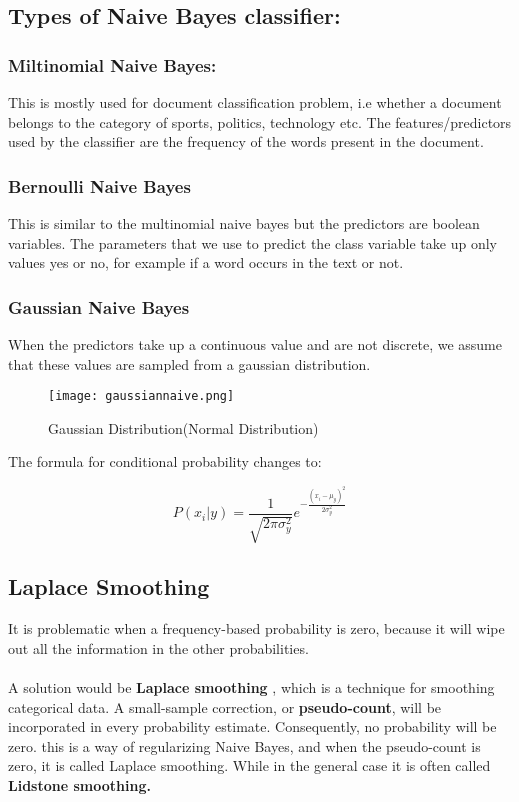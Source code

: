 \documentclass[12pt, A4]{report}
\begin{document}
\subsection*{Types of Naive Bayes classifier:}
	\subsubsection*{Miltinomial Naive Bayes:}
		This is mostly used for document classification problem, i.e whether a document belongs to the category of sports, politics, technology etc. The features/predictors used by the classifier are the frequency of the words present in the document.

	\subsubsection*{Bernoulli Naive Bayes}
		This is similar to the multinomial naive bayes but the predictors are boolean variables. The parameters that we use to predict the class variable take up only values yes or no, for example if a word occurs in the text or not.

	\subsubsection*{Gaussian Naive Bayes}
		When the predictors take up a continuous value and are not discrete, we assume that these values are sampled from a gaussian distribution.

		\begin{figure}[h]
			\centering
			\texttt{[image: gaussiannaive.png]}
			\caption{Gaussian Distribution(Normal Distribution)}
		\end{figure}

		The formula for conditional probability changes to:

		\begin{equation}
			P(x_i|y) = \frac{1}{\sqrt{2\pi\sigma_y^2}}e^{-\frac{(x_i-\mu_y)^2}{2\sigma_y^2}}
		\end{equation}

\subsection*{Laplace Smoothing}
	It is problematic when a frequency-based probability is zero, because it will wipe out all the information in the other probabilities.\\ \\
	A solution would be \textbf{Laplace smoothing} , which is a technique for smoothing categorical data. A small-sample correction, or \textbf{pseudo-count}, will be incorporated in every probability estimate. Consequently, no probability will be zero. this is a way of regularizing Naive Bayes, and when the pseudo-count is zero, it is called Laplace smoothing. While in the general case it is often called \textbf{Lidstone smoothing.}
\end{document}
